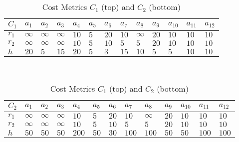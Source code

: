 \begin{table}[ht!]
\caption{Cost Metrics $C_1$ (top) and $C_2$ (bottom)}
\label{tab:applications:planner:cost}
\centering
\begin{tabular}{|p{0.7cm}|p{0.7cm}|p{0.7cm}|p{0.7cm}|p{0.7cm}|p{0.7cm}|p{0.7cm}|p{0.7cm}|p{0.7cm}|p{0.7cm}|p{0.7cm}|p{0.7cm}|p{0.7cm}|}
\hline
$C_1$ & $a_1$ & $a_2$ &$a_3$ &$a_4$ &$a_5$ &$a_6$ &$a_7$ &$a_8$ &$a_9$ &$a_{10}$ &$a_{11}$ &$a_{12}$ \\
\hline
$r_1$ & $\infty$ & $\infty$ & $\infty$ & $10$ & $5$ & $20$ & $10$ & $\infty$ & $20$ & $10$ & $10$ & $10$ \\
\hline
$r_2$ & $\infty$ & $\infty$ & $\infty$ & $10$ & $5$ & $10$ & $5$ & $5$ &$20$ & $10$ & $10$ & $10$ \\
\hline
$h$ & $20$ & $5$ & $15$ & $20$ & $5$ & $3$ & $15$ & $10$ & $5$ & $5$ & $10$ & $10$ \\
\hline
\end{tabular}
\\
\begin{tabular}{|p{0.7cm}|p{0.7cm}|p{0.7cm}|p{0.7cm}|p{0.7cm}|p{0.7cm}|p{0.7cm}|p{0.7cm}|p{0.7cm}|p{0.7cm}|p{0.7cm}|p{0.7cm}|p{0.7cm}|}
\hline
$C_2$ & $a_1$ & $a_2$ &$a_3$ &$a_4$ &$a_5$ &$a_6$ &$a_7$ &$a_8$ &$a_9$ &$a_{10}$ &$a_{11}$ &$a_{12}$ \\
\hline
$r_1$ & $\infty$ & $\infty$ & $\infty$ & $10$ & $5$ & $20$ & $10$ & $\infty$ & $20$ & $10$ & $10$ & $10$ \\
\hline
$r_2$ & $\infty$ & $\infty$ & $\infty$ & $10$ & $5$ & $10$ & $5$ & $5$ &$20$ & $10$ & $10$ & $10$ \\
\hline
$h$ & $50$ & $50$ & $50$ & $200$ & $50$ & $30$ & $100$ & $100$ & $50$ & $50$ & $100$ & $100$ \\
\hline
\end{tabular}
\end{table}